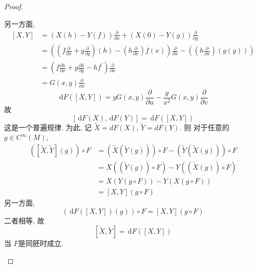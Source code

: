 \documentclass[../main.tex]{subfiles}
\begin{document}
\begin{proof}
\begin{enumerate}
        另一方面,  \[
       \begin{aligned}
        \left[ X,Y \right]&= \left( X\left( h \right)-Y\left( f \right)   \right)\frac{\partial }{\partial x}+ \left( X\left( 0 \right)-Y\left( g \right)   \right)\frac{\partial }{\partial y}\\ 
         &= \left( \left( f\frac{\partial }{\partial x}+ g\frac{\partial }{\partial y} \right)  \left( h \right)- \left( h\frac{\partial }{\partial x} \right)f\left( x \right)   \right)\frac{\partial }{\partial x}- \left( \left( h\frac{\partial }{\partial x} \right)\left( g\left( y \right)  \right)   \right)\\ 
          &=  \left( f\frac{\partial h}{\partial x}+ g\frac{\partial h}{\partial y}-hf^{\prime}  \right)\frac{\partial }{\partial x}\\ 
           &= G\left( x,y \right)\frac{\partial }{\partial x}       
       \end{aligned} 
        \] \[
        \,\mathrm{d} F\left( \left[ X,Y \right]  \right)=  y G\left( x,y \right)\frac{\partial }{\partial u}- \frac{y }{x^{2} }G\left( x,y \right)\frac{\partial }{\partial v}    
        \]故 \[
        \left[ \,\mathrm{d} F\left( X \right),\,\mathrm{d} F\left( Y \right)   \right]= \,\mathrm{d} F\left( \left[ X,Y \right]  \right)  
        \]
        这是一个普遍规律. 为此, 记 \(  \tilde{X}= d F\left( X \right)   \), \(  \tilde{Y}=  d F\left( Y \right)   \). 则 对于任意的 \(  g \in C^{\infty}\left( M \right)   \), \[
        \begin{aligned}
        \left( \left[ \tilde{X}, \tilde{Y} \right]\left( g \right)   \right)\circ F&= \left( \tilde{X}\left( \tilde{Y}\left( g \right)  \right)  \right)\circ F-\left( \tilde{Y}\left( \tilde{X}\left( g\right)  \right)\right)    \circ  F\\ 
         &=  X\left( \left( \tilde{Y}\left( g \right)  \right)\circ F  \right) - Y\left( \left( \tilde{X}\left( g \right)  \right)\circ F  \right)\\ 
          &= X\left( Y\left( g\circ F \right)  \right)- Y\left( X\left( g\circ F \right)  \right)    \\ 
           &= \left[ X,Y \right]\left( g\circ F \right)  
        \end{aligned}
        \]   另一方面,  \[
        \left( \,\mathrm{d} F\left( \left[ X,Y \right]  \right)\left( g \right)   \right)\circ F= \left[ X,Y \right]\left( g\circ F \right)   
        \]二者相等, 故 \[
        \left[ \tilde{X}, \tilde{Y} \right]= \,\mathrm{d} F\left( \left[ X,Y \right]  \right)  
        \]当 \(  F  \)是同胚时成立. 
    \end{enumerate}
    
\end{proof}
\end{document}

